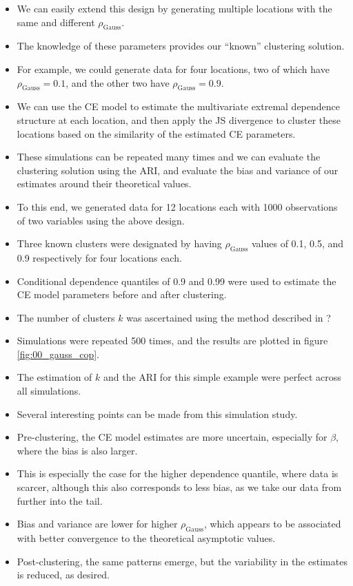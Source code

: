 \documentclass{article}
\numberwithin{equation}{section}
\begin{document}
\begin{itemize}
  \item We can easily extend this design by generating multiple locations with the same and different $\rho_{\text{Gauss}}$.
  \item The knowledge of these parameters provides our ``known'' clustering solution.
  \item For example, we could generate data for four locations, two of which have $\rho_{\text{Gauss}} = 0.1$, and the other two have $\rho_{\text{Gauss}} = 0.9$. 
  \item We can use the CE model to estimate the multivariate extremal dependence structure at each location, and then apply the JS divergence to cluster these locations based on the similarity of the estimated CE parameters. 
  \item These simulations can be repeated many times and we can evaluate the clustering solution using the ARI, and evaluate the bias and variance of our estimates around their theoretical values.
\end{itemize}

\begin{itemize}
  \item To this end, we generated data for 12 locations each with 1000 observations of two variables using the above design.
  \item Three known clusters were designated by having $\rho_{\text{Gauss}}$ values of 0.1, 0.5, and 0.9 respectively for four locations each.
  \item Conditional dependence quantiles of 0.9 and 0.99 were used to estimate the CE model parameters before and after clustering. 
  \item The number of clusters $k$ was ascertained using the method described in ? 
  \item Simulations were repeated 500 times, and the results are plotted in figure \ref{fig:00_gauss_cop}.
  \item The estimation of $k$ and the ARI for this simple example were perfect across all simulations.
  \item Several interesting points can be made from this simulation study.
  \item Pre-clustering, the CE model estimates are more uncertain, especially for $\beta$, where the bias is also larger.
  \item This is especially the case for the higher dependence quantile, where data is scarcer, although this also corresponds to less bias, as we take our data from further into the tail. 
  \item Bias and variance are lower for higher $\rho_{\text{Gauss}}$, which appears to be associated with better convergence to the theoretical asymptotic values.
  \item Post-clustering, the same patterns emerge, but the variability in the estimates is reduced, as desired. 
\end{itemize}
\end{document}
